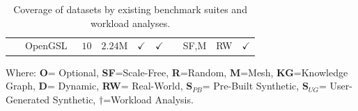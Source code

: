 \begin{landscape}
\begin{table}[htbp]
{\begin{tabular}{ll|cccccccc}
                { ~              }  & { OpenGSL~\cite{Zhou2024}               }        &  $10$     &  $2.24$M     & $\checkmark$  & $\checkmark$  &               & SF,M          & RW             & $\checkmark$  \\
            \end{tabular}
            \caption{Coverage of \gai datasets by existing benchmark suites and workload analyses.}
            \label{Table:benchmark-datasets}
        }
    \end{table}

    {
        \noindent
        \scriptsize 
        Where: 
        \textbf{O}= Optional, 
        \textbf{SF}=Scale-Free, 
        \textbf{R}=Random, 
        \textbf{M}=Mesh, 
        \textbf{KG}=Knowledge Graph, 
        \textbf{D}= Dynamic, 
        \textbf{RW}= Real-World, 
        \textbf{S$_{PB}$}= Pre-Built Synthetic, 
        \textbf{S$_{UG}$}= User-Generated Synthetic,
        \textbf{$\dagger$}=Workload Analysis.
        }


    

\end{landscape}


